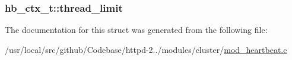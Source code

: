 \subsubsection[{\texorpdfstring{thread\+\_\+limit}{thread_limit}}]{ hb\+\_\+ctx\+\_\+t\+::thread\+\_\+limit}\hypertarget{structhb__ctx__t_ae4722a6dbfece05184e840ff79cca836}{}\label{structhb__ctx__t_ae4722a6dbfece05184e840ff79cca836}


The documentation for this struct was generated from the following file\+:\begin{DoxyCompactItemize}
\item 
/usr/local/src/github/\+Codebase/httpd-\/2../modules/cluster/\hyperlink{mod__heartbeat_8c}{mod\+\_\+heartbeat.\+c}\end{DoxyCompactItemize}
